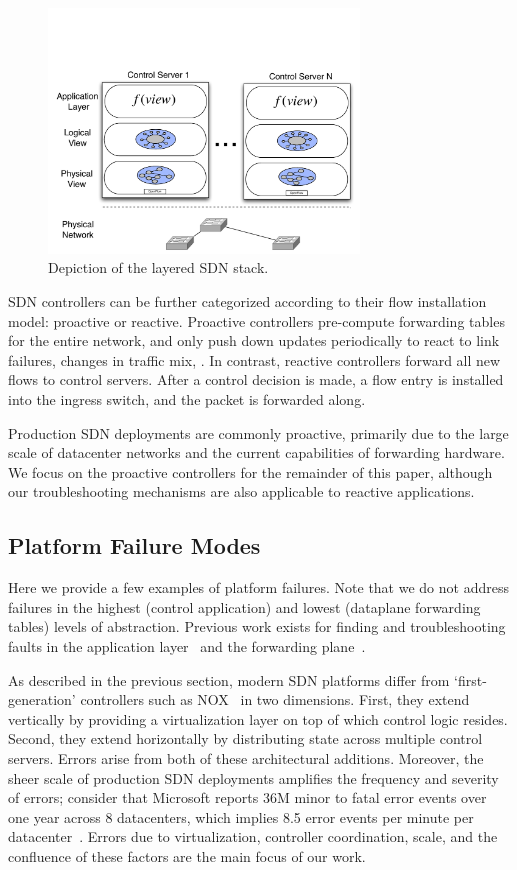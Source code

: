\begin{figure}[t]
    \includegraphics[width=3.25in]{../diagrams/architecture/SDN_Stack.pdf}
    \caption[]{\label{fig:basicarch} Depiction of the layered SDN stack.} 
\end{figure}

SDN controllers can be further categorized according to their flow
installation model: proactive or reactive.
Proactive controllers pre-compute forwarding tables for the entire network,
and only push down updates periodically to react to link failures, changes in
traffic mix, \etc. In contrast, reactive controllers forward all new flows to
control servers. After a control decision is made, a flow entry is installed
into the ingress switch, and the packet is forwarded along.

Production SDN deployments are commonly proactive, primarily due to the large
scale of datacenter networks and the current capabilities of forwarding hardware.
We focus on the proactive controllers for the remainder of this paper,
although our troubleshooting mechanisms are also applicable to reactive
applications.

\subsection{Platform Failure Modes}

Here we provide a few examples of platform failures. Note that
we do not address failures in the highest (control application) and lowest
(dataplane forwarding tables) levels of abstraction. Previous work exists
for finding and troubleshooting faults in the application layer~\cite{nice}
and the forwarding plane~\cite{anteater}.

As described in the previous section, modern SDN platforms differ from
`first-generation' controllers such as NOX~\cite{nox} in two dimensions. 
First, they extend vertically by providing a virtualization layer on top of
which control logic resides. Second, they extend horizontally by
distributing state across multiple control servers. Errors arise from both of
these architectural additions. Moreover, the sheer scale of production
SDN deployments amplifies the
frequency and severity of errors; consider that Microsoft reports 36M 
minor to fatal error events over one year across 8 datacenters,
which implies 8.5 error events per minute per
datacenter~\cite{Greenberg:2009:VSF:1592568.1592576}. Errors due to virtualization,
controller coordination, scale, and the confluence of these factors are the main
focus of our work.


